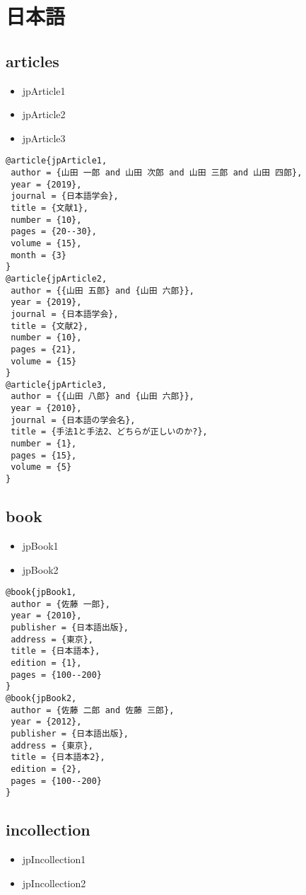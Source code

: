 \documentclass[9pt, twocolumn, a4paper]{jsarticle}
\begin{document}
\section{日本語}
\begin{bibunit}[IEEJtran]

\subsection{articles}
\begin{itemize}
  \item jpArticle1 \cite{jpArticle1}
  \item jpArticle2 \cite{jpArticle2}
  \item jpArticle3 \cite{jpArticle3}
\end{itemize}

\begin{lstlisting}
@article{jpArticle1,
 author = {山田 一郎 and 山田 次郎 and 山田 三郎 and 山田 四郎},
 year = {2019},
 journal = {日本語学会},
 title = {文献1},
 number = {10},
 pages = {20--30},
 volume = {15},
 month = {3}
}
@article{jpArticle2,
 author = {{山田 五郎} and {山田 六郎}},
 year = {2019},
 journal = {日本語学会},
 title = {文献2},
 number = {10},
 pages = {21},
 volume = {15}
}
@article{jpArticle3,
 author = {{山田 八郎} and {山田 六郎}},
 year = {2010},
 journal = {日本語の学会名},
 title = {手法1と手法2、どちらが正しいのか?},
 number = {1},
 pages = {15},
 volume = {5}
}
\end{lstlisting}



\subsection{book}
\begin{itemize}
  \item jpBook1 \cite{jpBook1}
  \item jpBook2 \cite{jpBook2}
\end{itemize}

\begin{lstlisting}
@book{jpBook1,
 author = {佐藤 一郎},
 year = {2010},
 publisher = {日本語出版},
 address = {東京},
 title = {日本語本},
 edition = {1},
 pages = {100--200}
}
@book{jpBook2,
 author = {佐藤 二郎 and 佐藤 三郎},
 year = {2012},
 publisher = {日本語出版},
 address = {東京},
 title = {日本語本2},
 edition = {2},
 pages = {100--200}
}
\end{lstlisting}

\subsection{incollection}
\begin{itemize}
  \item jpIncollection1 \cite{jpIncollection1}
  \item jpIncollection2 \cite{jpIncollection2}
\end{itemize}


\end{bibunit}
\end{document}
